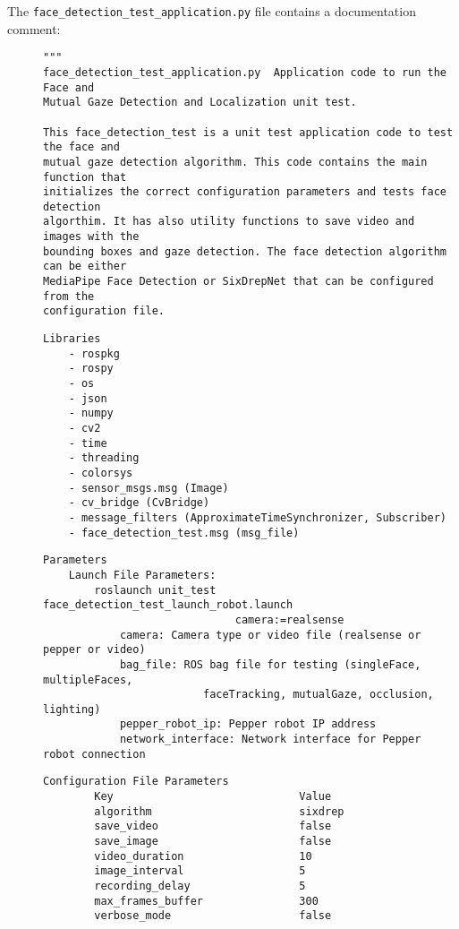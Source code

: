 \documentclass{CSSRforAfrica}
\newcommand{\checkboxChecked}{\fbox{\ding{51}}} %
\begin{document}
\noindent The {\small \verb+face_detection_test_application.py+} file contains a documentation comment:

\begin{description}

\item[\checkboxChecked] 
 {\small 
\begin{verbatim}
"""
face_detection_test_application.py  Application code to run the Face and 
Mutual Gaze Detection and Localization unit test.

This face_detection_test is a unit test application code to test the face and 
mutual gaze detection algorithm. This code contains the main function that 
initializes the correct configuration parameters and tests face detection 
algorthim. It has also utility functions to save video and images with the 
bounding boxes and gaze detection. The face detection algorithm can be either 
MediaPipe Face Detection or SixDrepNet that can be configured from the 
configuration file. 
\end{verbatim}}

\item[\checkboxChecked] 
 {\small 
\begin{verbatim}
Libraries
    - rospkg
    - rospy
    - os
    - json
    - numpy
    - cv2
    - time
    - threading
    - colorsys
    - sensor_msgs.msg (Image)
    - cv_bridge (CvBridge)
    - message_filters (ApproximateTimeSynchronizer, Subscriber)
    - face_detection_test.msg (msg_file)
\end{verbatim}}

\item[\checkboxChecked] 
 {\small 
\begin{verbatim}
Parameters
    Launch File Parameters:
        roslaunch unit_test face_detection_test_launch_robot.launch 
                              camera:=realsense
            camera: Camera type or video file (realsense or pepper or video)
            bag_file: ROS bag file for testing (singleFace, multipleFaces, 
                         faceTracking, mutualGaze, occlusion, lighting)
            pepper_robot_ip: Pepper robot IP address
            network_interface: Network interface for Pepper robot connection
\end{verbatim}}

\item[\checkboxChecked] 
 {\small 
\begin{verbatim}
Configuration File Parameters
        Key                             Value
        algorithm                       sixdrep
        save_video                      false
        save_image                      false
        video_duration                  10
        image_interval                  5
        recording_delay                 5
        max_frames_buffer               300
        verbose_mode                    false
\end{verbatim}}


\end{description}
\end{document}
